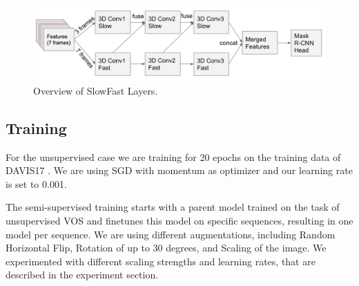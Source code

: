 \begin{figure}
	\centering
	\includegraphics[width=\columnwidth]{figures/slowfast.png}
	\caption{Overview of SlowFast Layers.}
	\label{slowfast}
\end{figure}
\subsection{Training}
For the unsupervised case we are training for 20 epochs on the training data of DAVIS17 \cite{davis_2017}. We are using SGD with momentum as optimizer and our learning rate is set to 0.001.

The semi-supervised training starts with a parent model trained on the task of unsupervised VOS and finetunes this model on specific sequences, resulting in one model per sequence. We are using different augmentations, including Random Horizontal Flip, Rotation of up to 30 degrees, and Scaling of the image. We experimented with different scaling strengths and learning rates, that are described in the experiment section.